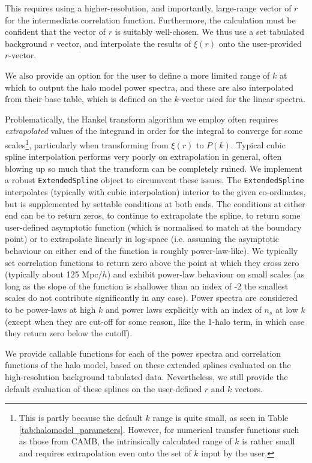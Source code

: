 \documentclass[5p,aas_macros]{elsarticle}
\begin{document}
This requires using a higher-resolution, and importantly, large-range vector of $r$ for the intermediate correlation function. Furthermore, the calculation must be confident that the vector of $r$ is suitably well-chosen. We thus use a set tabulated background $r$ vector, and interpolate the results of $\xi(r)$ onto the user-provided $r$-vector. 

We also provide an option for the user to define a more limited range of $k$ at which to output the halo model power spectra, and these are also interpolated from their base table, which is defined on the $k$-vector used for the linear spectra. 

Problematically, the Hankel transform algorithm we employ often requires \textit{extrapolated} values of the integrand in order for the integral to converge for some scales\footnote{This is partly because the default $k$ range is quite small, as seen in Table \ref{tab:halomodel_parameters}. However, for numerical transfer functions such as those from CAMB, the intrinsically calculated range of $k$ is rather small and requires extrapolation even onto the set of $k$ input by the user.}, particularly when transforming from $\xi(r)$ to $P(k)$.
Typical cubic spline interpolation performs very poorly on extrapolation in general, often blowing up so much that the transform can be completely ruined.
We implement a robust \verb|ExtendedSpline| object to circumvent these issues. 
The \verb|ExtendedSpline| interpolates (typically with cubic interpolation) interior to the given co-ordinates, but is supplemented by settable conditions at both ends. 
The conditions at either end can be to return zeros, to continue to extrapolate the spline, to return some user-defined asymptotic function (which is normalised to match at the boundary point) or to extrapolate linearly in log-space (i.e. assuming the asymptotic behaviour on either end of the function is roughly power-law-like). 
We typically set correlation functions to return zero above the point at which they cross zero (typically about 125 Mpc/$h$) and exhibit power-law behaviour on small scales (as long as the slope of the function is shallower than an index of -2 the smallest scales do not contribute significantly in any case). 
Power spectra are considered to be power-laws at high $k$ and power laws explicitly with an index of $n_s$ at low $k$ (except when they are cut-off for some reason, like the 1-halo term, in which case they return zero below the cutoff).

We provide callable functions for each of the power spectra and correlation functions of the halo model, based on these extended splines evaluated on the high-resolution background tabulated data. 
Nevertheless, we still provide the default evaluation of these splines on the user-defined $r$ and $k$ vectors. 
\end{document}
